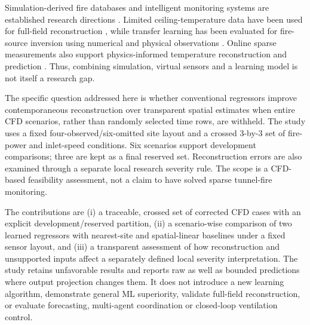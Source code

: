 \documentclass[preprint,12pt,authoryear]{elsarticle}
\begin{document}
Simulation-derived fire databases and intelligent monitoring systems are
established research directions \citep{Zhang2021TunnelDatabase,Wu2022TunnelFirefighting}.
Limited ceiling-temperature data have been used for full-field reconstruction
\citep{Guo2024LimitedTemperature}, while transfer learning has been evaluated
for fire-source inversion using numerical and physical observations
\citep{Jiang2025TransferTunnel}. Online sparse measurements also support
physics-informed temperature reconstruction and prediction
\citep{Jiang2026PhysicsInformed}. Thus, combining simulation, virtual sensors
and a learning model is not itself a research gap.

The specific question addressed here is whether conventional regressors
improve contemporaneous reconstruction over transparent spatial estimates
when entire CFD scenarios, rather than randomly selected time rows, are
withheld. The study uses a fixed four-observed/six-omitted site layout and a
crossed 3-by-3 set of fire-power and inlet-speed conditions. Six scenarios
support development comparisons; three are kept as a final reserved set.
Reconstruction errors are also examined through a separate local research
severity rule. The scope is a CFD-based feasibility assessment, not a claim
to have solved sparse tunnel-fire monitoring.

The contributions are (i) a traceable, crossed set of corrected CFD cases
with an explicit development/reserved partition, (ii) a scenario-wise
comparison of two learned regressors with nearest-site and spatial-linear
baselines under a fixed sensor layout, and (iii) a transparent assessment of
how reconstruction and unsupported inputs affect a separately defined local
severity interpretation. The study retains unfavorable results and reports
raw as well as bounded predictions where output projection changes them.
It does not introduce a new learning algorithm, demonstrate general ML
superiority, validate full-field reconstruction, or evaluate forecasting,
multi-agent coordination or closed-loop ventilation control.
\end{document}
